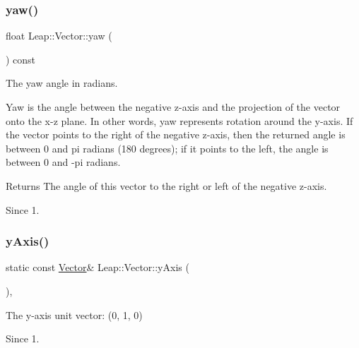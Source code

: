 \subsubsection{\texorpdfstring{yaw()}{yaw()}}
{\footnotesize\ttfamily float Leap\+::\+Vector\+::yaw (\begin{DoxyParamCaption}{ }\end{DoxyParamCaption}) const\hspace{0.3cm}{\ttfamily [inline]}}

The yaw angle in radians.

Yaw is the angle between the negative z-\/axis and the projection of the vector onto the x-\/z plane. In other words, yaw represents rotation around the y-\/axis. If the vector points to the right of the negative z-\/axis, then the returned angle is between 0 and pi radians (180 degrees); if it points to the left, the angle is between 0 and -\/pi radians.




\begin{DoxyCodeInclude}
\end{DoxyCodeInclude}


\begin{DoxyReturn}{Returns}
The angle of this vector to the right or left of the negative z-\/axis. 
\end{DoxyReturn}
\begin{DoxySince}{Since}
1. 
\end{DoxySince}
\mbox{\label{struct_leap_1_1_vector_a9a387eb8ab05e55708542c031c641f31}} 
\subsubsection{\texorpdfstring{y\+Axis()}{yAxis()}}
{\footnotesize\ttfamily static const \hyperlink{struct_leap_1_1_vector}{Vector}\& Leap\+::\+Vector\+::y\+Axis (\begin{DoxyParamCaption}{ }\end{DoxyParamCaption})\hspace{0.3cm}{\ttfamily [inline]}, {\ttfamily [static]}}

The y-\/axis unit vector\+: (0, 1, 0)


\begin{DoxyCodeInclude}
\end{DoxyCodeInclude}
 \begin{DoxySince}{Since}
1. 
\end{DoxySince}
\mbox{\label{struct_leap_1_1_vector_a6ec3652d02a9599bc2a00411a1e05501}} 
